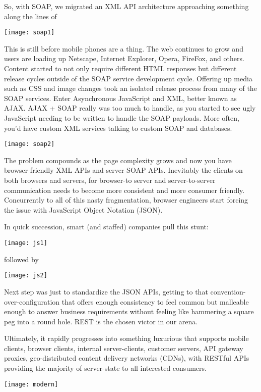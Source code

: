 \begin{minipage}{\linewidth}
So, with SOAP, we migrated an XML API architecture approaching something along the lines of

\texttt{[image: soap1]}

\end{minipage}

This is still before mobile phones are a thing.  The web continues to grow and users are loading up Netscape, Internet Explorer, Opera, FireFox, and others.  Content started to not only require different HTML responses but different release cycles outside of the SOAP service development cycle.  Offering up media such as CSS and image changes took an isolated release process from many of the SOAP services.  Enter Asynchronous JavaScript and XML, better known as AJAX.  AJAX + SOAP really was too much to handle, as you started to see ugly JavaScript needing to be written to handle the SOAP payloads.  More often, you'd have custom XML services talking to custom SOAP and databases.

\texttt{[image: soap2]}

The problem compounds as the page complexity grows and now you have browser-friendly XML APIs and server SOAP APIs.  Inevitably the clients on both browsers and servers, for browser-to server and server-to-server communication needs to become more consistent and more consumer friendly.  Concurrently to all of this nasty fragmentation, browser engineers start forcing the issue with JavaScript Object Notation (JSON).

In quick succession, smart (and staffed) companies pull this stunt:

\texttt{[image: js1]}

followed by

\texttt{[image: js2]}

Next step was just to standardize the JSON APIs, getting to that convention-over-configuration that offers enough consistency to feel common but malleable enough to answer business requirements without feeling like hammering a square peg into a round hole.  REST is the chosen victor in our arena.

Ultimately, it rapidly progresses into something luxurious that supports mobile clients, browser clients, internal server-clients, customer servers, API gateway proxies, geo-distributed content delivery networks (CDNs), with RESTful APIs providing the majority of server-state to all interested consumers.

\texttt{[image: modern]}

